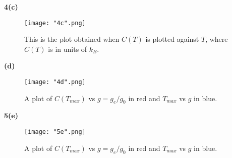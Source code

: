 \documentclass[10pt]{article}
\begin{document}
\textbf{4(c)}
\begin{figure}[H]
  \centering
  \texttt{[image: "4c".png]}
  \caption{This is the plot obtained when $C(T)$ is plotted against $T$, where $C(T)$ is in units of $k_{B}$.}
  \label{plot1}
\end{figure}
\textbf{(d)}
\begin{figure}[H]
  \centering
  \texttt{[image: "4d".png]}
  \caption{A plot of $C(T_{max})$ vs $g = g_{e}/g_{0}$ in red and $T_{max}$ vs $g$ in blue.}
  \label{plot2}
\end{figure}
\textbf{5(e)}
\begin{figure}[H]
  \centering
  \texttt{[image: "5e".png]}
  \caption{A plot of $C(T_{max})$ vs $g = g_{e}/g_{0}$ in red and $T_{max}$ vs $g$ in blue.}
  \label{plot2}
\end{figure}
\end{document}
